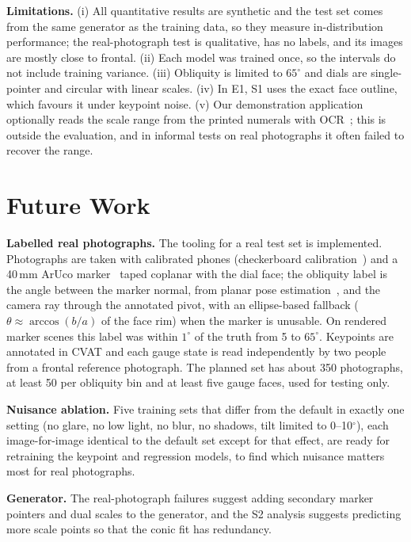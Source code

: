 \documentclass[conference]{IEEEtran}
\begin{document}
\textbf{Limitations.} (i) All quantitative results are synthetic and the test set comes from the same generator as
the training data, so they measure in-distribution performance; the real-photograph test is qualitative, has no
labels, and its images are mostly close to frontal.
(ii) Each model was trained once, so the intervals do not include training variance. (iii) Obliquity is
limited to $65^\circ$ and dials are single-pointer and circular with linear scales. (iv) In E1, S1 uses the
exact face outline, which favours it under keypoint noise. (v) Our demonstration application optionally reads
the scale range from the printed numerals with OCR~\cite{du2020,rapidocr2021}; this is outside the evaluation,
and in informal tests on real photographs it often failed to recover the range.

\section{Future Work}\label{sec:future}
\textbf{Labelled real photographs.} The tooling for a real test set is implemented. Photographs are taken with
calibrated phones (checkerboard calibration~\cite{zhang2000}) and a 40\,mm ArUco marker~\cite{garridojurado2014}
taped coplanar with the dial face; the obliquity label is the angle between the marker normal, from planar pose
estimation~\cite{collins2014}, and the camera ray through the annotated pivot, with an ellipse-based fallback
($\theta\approx\arccos(b/a)$ of the face rim) when the marker is unusable. On rendered marker scenes this label was
within $1^\circ$ of the truth from 5 to $65^\circ$. Keypoints are annotated in CVAT and each gauge state is read
independently by two people from a frontal reference photograph. The planned set has about 350 photographs, at least
50 per obliquity bin and at least five gauge faces, used for testing only.

\textbf{Nuisance ablation.} Five training sets that differ from the default in exactly one setting (no glare, no low
light, no blur, no shadows, tilt limited to 0--10$^\circ$), each image-for-image identical to the default set except
for that effect, are ready for retraining the keypoint and regression models, to find which nuisance matters most for
real photographs.

\textbf{Generator.} The real-photograph failures suggest adding secondary marker pointers and dual scales to the
generator, and the S2 analysis suggests predicting more scale points so that the conic fit has redundancy.
\end{document}
